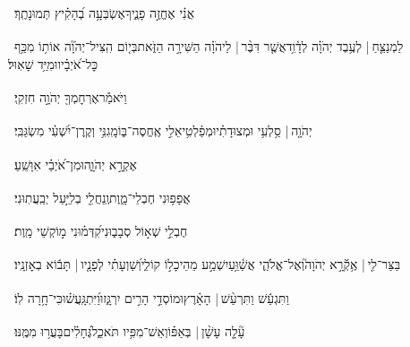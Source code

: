 \documentclass[12pt]{article}
\newcommand{\loc}[1]{\textsuperscript{\locf{#1}}}
\begin{document}
{\loc{ טו}~}‏אֲנִ֗י  אֶחֱזֶ֣ה פָנֶ֑יךָ{\hfill}אֶשְׂבְּעָ֥ה בְ֝הָקִ֗יץ תְּמוּנָתֶֽךָ׃\par\pend
\ledpb
\pstart[\subsection*{\textcolor{red}{פרק יח}}]\label{פרק יח}
{\loc{ א}~}‏לַמְנַצֵּ֤חַ |  לְעֶ֥בֶד יְהֹוָ֗ה לְדָ֫וִ֥ד\newline\hspace*{.5em}אֲשֶׁ֤ר דִּבֶּ֨ר |  לַיהֹוָ֗ה{\hfill} הַשִּׁירָ֣ה הַזֹּ֑את\newline\hspace*{.5em}בְּי֤וֹם הִֽצִּיל־יְהֹוָ֘ה אוֹת֥וֹ מִכַּ֥ף כׇּל־אֹ֝יְבָ֗יו{\hfill}וּמִיַּ֥ד שָׁאֽוּל׃\par

{\loc{ ב}~}‏וַיֹּאמַ֡ר{\hfill}אֶרְחׇמְךָ֖ יְהֹוָ֣ה חִזְקִֽי׃\par

{\loc{ ג}~}‏יְהֹוָ֤ה |  סַ֥לְעִ֥י וּמְצוּדָתִ֗י{\hfill}וּמְפַ֫לְטִ֥י\newline\hspace*{.5em}אֵלִ֣י  אֶֽחֱסֶה־בּ֑וֹ{\hfill}מָֽגִנִּ֥י וְקֶֽרֶן־יִ֝שְׁעִ֗י מִשְׂגַּבִּֽי׃\par

{\loc{ ד}~}‏ אֶקְרָ֣א יְהֹוָ֑ה{\hfill}וּמִן־אֹ֝יְבַ֗י אִוָּשֵֽׁעַ׃\par

{\loc{ ה}~}‏אֲפָפ֥וּנִי חֶבְלֵי־מָ֑וֶת{\hfill}וְֽנַחֲלֵ֖י בְלִיַּ֣עַל יְבַֽעֲתֽוּנִי׃\par

{\loc{ ו}~}‏חֶבְלֵ֣י שְׁא֣וֹל סְבָב֑וּנִי{\hfill}קִ֝דְּמ֗וּנִי מ֣וֹקְשֵׁי מָֽוֶת׃\par

{\loc{ ז}~}‏בַּצַּר־לִ֤י |  אֶ֥קְﬞרָ֣א יְהֹוָה֮{\hfill}וְאֶל־אֱלֹהַ֢י אֲשַׁ֫וֵּ֥עַ\newline\hspace*{.5em}יִשְׁמַ֣ע מֵהֵיכָל֣וֹ קוֹלִ֑י{\hfill}וְ֝שַׁוְעָתִ֗י לְפָנָ֤יו |  תָּב֬וֹא בְאׇזְנָֽיו׃\par

{\loc{ ח}~}‏וַתִּגְעַ֬שׁ וַתִּרְעַ֨שׁ |  הָאָ֗רֶץ{\hfill}וּמוֹסְדֵ֣י הָרִ֣ים יִרְגָּ֑זוּ\newline\hspace*{.5em}וַ֝יִּתְגָּֽעֲשׁ֗וּ{\hfill}כִּי־חָ֥רָה לֽוֹ׃\par

{\loc{ ט}~}‏עָ֘לָ֤ה עָשָׁ֨ן |  בְּאַפּ֗וֹ{\hfill}וְאֵשׁ־מִפִּ֥יו תֹּאכֵ֑ל\newline\hspace*{.5em}גֶּ֝חָלִ֗ים{\hfill}בָּעֲר֥וּ מִמֶּֽנּוּ׃\par
\end{document}
